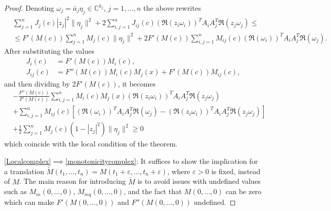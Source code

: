 \documentclass[10pt,a4paper]{amsart}
\newcommand{\C}{\mathbb{C}}
\begin{document}
\begin{proof}
		Denoting $\omega_j = \bar{a}_j\eta_j \in\C^{k_j}$, $j=1,\ldots,n$ the above rewrites
		\begin{align*}
			& \sum_{j=1}^n J_j(c) |z_j|^2\|\eta_j\|^2+ 2 \sum_{ i,j=1}^{n} J_{ij}(c)(\Re(z_{i}\omega_i))^{T} A_{i}A_{j}^{T} \Re(z_{j}\omega_j)\leq\\
			&\leq F'(M(c))\sum_{j=1}^n M_j(c) \|\eta_j\|^2+ 2 F'(M(c))\sum_{ i,j=1}^{n} M_{ij}(c)(\Re(\omega_i))^{T} A_iA_j^T \Re(\omega_j).  
		\end{align*}
		After substituting the values 
		\begin{align*}
			J_i(c) &= F'(M(c)) M_i(c),\\
			J_{ij}(c) &= F''(M(c)) M_i(c)M_j(x) + F'(M(c)) M_{ij}(c),
		\end{align*}
		and then dividing by 2$F'(M(c))$, it becomes 
		\begin{align*}
			&-\frac{F''(M(c))}{F'(M(c))} \sum_{ i,j=1}^{n} M_i(c)M_j(x) (\Re(z_{i}\omega_i))^{T} A_{i}A_{j}^{T} \Re(z_{j}\omega_j)\\
			&+\sum_{ i,j=1}^{n} M_{ij}(c)\left[ (\Re(\omega_i))^{T} A_iA_j^T\Re(\omega_j)-  (\Re(z_{i}\omega_i))^{T} A_{i}A_{j}^{T} \Re(z_{j}\omega_j) \right] \\
			&+ \frac{1}{2}\sum_{j=1}^n M_j(c)(1-|z_j|^2) \|\eta_j\|^2  \geq0
		\end{align*}
		which coincide with the local condition of the theorem.
		
\eqref{Localcomplex}$\implies$\eqref{monotonicitycomplex}: It suffices to show the implication for a translation $\tilde{M}(t_1,\ldots,t_n) = M(t_1+\varepsilon,\ldots,t_n+\varepsilon)$, where $\varepsilon > 0$ is fixed, instead of $M$. The main reason for introducing $\tilde{M}$ is to avoid issues with undefined values such as $M_m(0,\ldots,0)$, $M_{mq}(0,\ldots,0)$, and the fact that $M(0,\ldots,0)$ can be zero  which can make $F'(M(0,\ldots,0))$ and $F''(M(0,\ldots,0))$ undefined. 
		

\end{proof}
\end{document}
